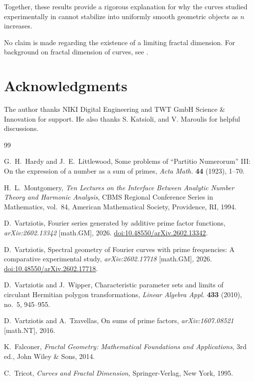 \documentclass[11pt]{article}
\theoremstyle{plain}
\begin{document}
Together, these results provide a rigorous explanation for why the curves studied experimentally in \cite{Vartziotis2026a,Vartziotis2026b} cannot stabilize into uniformly smooth geometric objects as $n$ increases.

No claim is made regarding the existence of a limiting fractal dimension. For background on fractal dimension of curves, see \cite{Falconer2014,Tricot1995}.

\section*{Acknowledgments}

The author thanks NIKI Digital Engineering and TWT GmbH Science \& Innovation for support. He also thanks S. Katsioli, and V. Maroulis for helpful discussions.

\begin{thebibliography}{99}

G.~H.~Hardy and J.~E.~Littlewood,
\newblock Some problems of ``Partitio Numerorum'' III: On the expression of a number as a sum of primes,
\newblock \emph{Acta Math.} \textbf{44} (1923), 1--70.

H.~L.~Montgomery,
\newblock \emph{Ten Lectures on the Interface Between Analytic Number Theory and Harmonic Analysis},
\newblock CBMS Regional Conference Series in Mathematics, vol.~84,
\newblock American Mathematical Society, Providence, RI, 1994.

D.~Vartziotis,
\newblock Fourier series generated by additive prime factor functions,
\newblock \emph{arXiv:2602.13342} [math.GM], 2026.
\newblock \href{https://doi.org/10.48550/arXiv.2602.13342}{doi:10.48550/arXiv.2602.13342}.

D.~Vartziotis,
\newblock Spectral geometry of Fourier curves with prime frequencies: A comparative experimental study,
\newblock \emph{arXiv:2602.17718} [math.GM], 2026.
\newblock \href{https://doi.org/10.48550/arXiv.2602.17718}{doi:10.48550/arXiv.2602.17718}.

D.~Vartziotis and J.~Wipper,
\newblock Characteristic parameter sets and limits of circulant Hermitian polygon transformations,
\newblock \emph{Linear Algebra Appl.} \textbf{433} (2010), no.~5, 945--955.

D.~Vartziotis and A.~Tzavellas,
\newblock On sums of prime factors,
\newblock \emph{arXiv:1607.08521} [math.NT], 2016.

K.~Falconer,
\newblock \emph{Fractal Geometry: Mathematical Foundations and Applications},
\newblock 3rd ed., John Wiley \& Sons, 2014.

C.~Tricot,
\newblock \emph{Curves and Fractal Dimension},
\newblock Springer-Verlag, New York, 1995.

\end{thebibliography}
\end{document}

